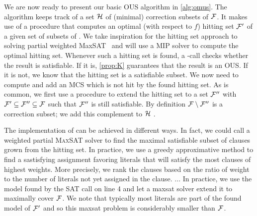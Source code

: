 We are now ready to present our basic OUS algorithm in \cref{alg:omus}. 
The algorithm keeps track of a set $\mathcal{H}$ of (minimal) correction subsets of $\mathcal{F} $. 
It makes use of a procedure \ohs that computes an optimal (with respect to $f$) hitting set $\mathcal{F} '$  of a given set of subsets of \formula.
We take inspiration for the hitting set approach to solving partial weighted MaxSAT~\cite{davies2011solving} and will use a MIP solver to compute the optimal hitting set.
Whenever such a hitting set is found, a \sat-call checks whether the result is satisfiable. If it is, \cref{prop:K} guarantees that the result is an OUS. 
If it is not, we know that the hitting set is a satisfiable subset. We now need to compute and add an MCS which is not hit by the found hitting set.
As is common, we first use a procedure \grow to extend the hitting set to a set $\mathcal{F} ''$ with $\mathcal{F} '\subseteq \mathcal{F} ''\subseteq\mathcal{F} $ such that $\mathcal{F} ''$ is still satisfiable. By definition $\mathcal{F}  \setminus \mathcal{F} ''$ is a correction subset; we add this complement to $\mathcal{H}$ .  

The implementation of \grow can be achieved in different ways.
In fact, we could call a weighted partial \textsc{MaxSAT} solver to find the maximal satisfiable subset of clauses grown from the hitting set.
In practice, we use a greedy approximative method to find a sastisfying assignment favoring literals that will satisfy the most clauses of highest weights.
More precisely, we rank the clauses based on the ratio of weight to the number of literals not yet assigned in the clause.
... In practice, we use the model found by the SAT call on line 4 and let a maxsat solver extend it to maximally cover $\mathcal{F} $. We note that typically most literals are part of the found model of $\mathcal{F} '$ and so this maxsat problem is considerably smaller than $\mathcal{F} $.

